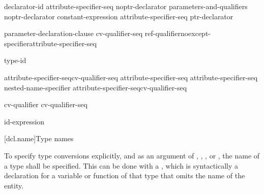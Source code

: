 \begin{bnf}
\br
    declarator-id attribute-specifier-seq\opt\br
    noptr-declarator parameters-and-qualifiers\br
    noptr-declarator \terminal{[} constant-expression\opt{} \terminal{]} attribute-specifier-seq\opt\br
    \terminal{(} ptr-declarator \terminal{)}
\end{bnf}

\begin{bnf}
\br
    \terminal{(} parameter-declaration-clause \terminal{)} cv-qualifier-seq\opt\br
\hspace*{\bnfindentinc}ref-qualifier\opt noexcept-specifier\opt attribute-specifier-seq\opt
\end{bnf}

\begin{bnf}
\br
    \terminal{->} type-id
\end{bnf}

\begin{bnf}
\br
    \terminal{*} attribute-specifier-seq\opt cv-qualifier-seq\opt\br
    \terminal{\&} attribute-specifier-seq\opt\br
    \terminal{\&\&} attribute-specifier-seq\opt\br
    nested-name-specifier \terminal{*} attribute-specifier-seq\opt cv-qualifier-seq\opt
\end{bnf}

\begin{bnf}
\br
    cv-qualifier cv-qualifier-seq\opt
\end{bnf}

\begin{bnf}
\br
    \br
\end{bnf}

\begin{bnf}
\br
    \terminal{\&}\br
    \terminal{\&\&}
\end{bnf}

\begin{bnf}
\br
    \opt id-expression
\end{bnf}

[dcl.name]{Type names}

\pnum
{}%
To specify type conversions explicitly,
%
and as an argument of
,
,
,
or
,
the name of a type shall be specified.
This can be done with a
,
which is syntactically a declaration for a variable or function
of that type that omits the name of the entity.

